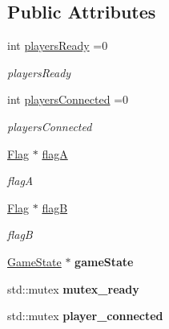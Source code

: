 \subsection*{Public Attributes}
\begin{DoxyCompactItemize}
\item 
int \hyperlink{class_server_a6e14276d850e50c574dda1fe5954afb0}{players\+Ready} =0\hypertarget{class_server_a6e14276d850e50c574dda1fe5954afb0}{}\label{class_server_a6e14276d850e50c574dda1fe5954afb0}

\begin{DoxyCompactList}\small\item\em players\+Ready \end{DoxyCompactList}\item 
int \hyperlink{class_server_a4cdd8e1812e08357287c75cf60964f96}{players\+Connected} =0\hypertarget{class_server_a4cdd8e1812e08357287c75cf60964f96}{}\label{class_server_a4cdd8e1812e08357287c75cf60964f96}

\begin{DoxyCompactList}\small\item\em players\+Connected \end{DoxyCompactList}\item 
\hyperlink{class_flag}{Flag} $\ast$ \hyperlink{class_server_a579633604bb0c1630b982b3685aef6ba}{flagA}\hypertarget{class_server_a579633604bb0c1630b982b3685aef6ba}{}\label{class_server_a579633604bb0c1630b982b3685aef6ba}

\begin{DoxyCompactList}\small\item\em flagA \end{DoxyCompactList}\item 
\hyperlink{class_flag}{Flag} $\ast$ \hyperlink{class_server_aca03e61e39d547fd62c09d5a23ba01c0}{flagB}\hypertarget{class_server_aca03e61e39d547fd62c09d5a23ba01c0}{}\label{class_server_aca03e61e39d547fd62c09d5a23ba01c0}

\begin{DoxyCompactList}\small\item\em flagB \end{DoxyCompactList}\item 
\hyperlink{class_game_state}{Game\+State} $\ast$ {\bfseries game\+State}\hypertarget{class_server_a8d87d2ea9fec371d2ff0c644b7b5828e}{}\label{class_server_a8d87d2ea9fec371d2ff0c644b7b5828e}

\item 
std\+::mutex {\bfseries mutex\+\_\+ready}\hypertarget{class_server_a84657db7d762d14229c0ac6a6543f25a}{}\label{class_server_a84657db7d762d14229c0ac6a6543f25a}

\item 
std\+::mutex {\bfseries player\+\_\+connected}\hypertarget{class_server_ae5c7d94be60aee25c7625618df3f9be3}{}\label{class_server_ae5c7d94be60aee25c7625618df3f9be3}

\end{DoxyCompactItemize}



